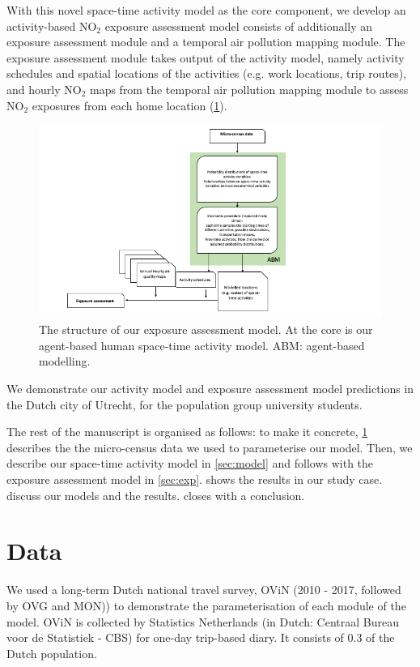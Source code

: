 \documentclass[]{article}
\begin{document}
With this novel space-time activity model as the core component, we develop an activity-based NO$_2$ exposure assessment model consists of additionally an exposure assessment module and a temporal air pollution mapping module. The exposure assessment module takes output of the activity model, namely activity schedules and spatial locations of the activities (e.g. work locations, trip routes), and hourly NO$_2$ maps from the temporal air pollution mapping module to assess NO$_2$ exposures from each home location (\cref{fig:expflow}).     

\begin{figure}
    \centering
    \includegraphics[width=\linewidth]{figure/exposureflow.png}
    \caption{The structure of our exposure assessment model. At the core is our agent-based human space-time activity model. ABM: agent-based modelling. }
    \label{fig:expflow}
\end{figure}
We demonstrate our activity model and exposure assessment model predictions in the Dutch city of Utrecht, for the population group university students.  

The rest of the manuscript is organised as follows: to make it concrete,  \cref{sec:data} describes the the micro-census data we used to parameterise our model. Then, we describe our space-time activity model in \cref{sec:model} and follows with the exposure assessment model in \cref{sec:exp}.  shows the results in our study case.  discuss our models and the results.  closes with a conclusion.


\section{Data}
\label{sec:data} 
We used a long-term Dutch national travel survey, OViN (2010 - 2017, followed by OVG and MON)) to demonstrate the parameterisation of each module of the model. OViN is collected by Statistics Netherlands (in Dutch: Centraal Bureau voor de Statistiek - CBS) for one-day trip-based diary. It consists of 0.3 of the Dutch population. 
\end{document}
